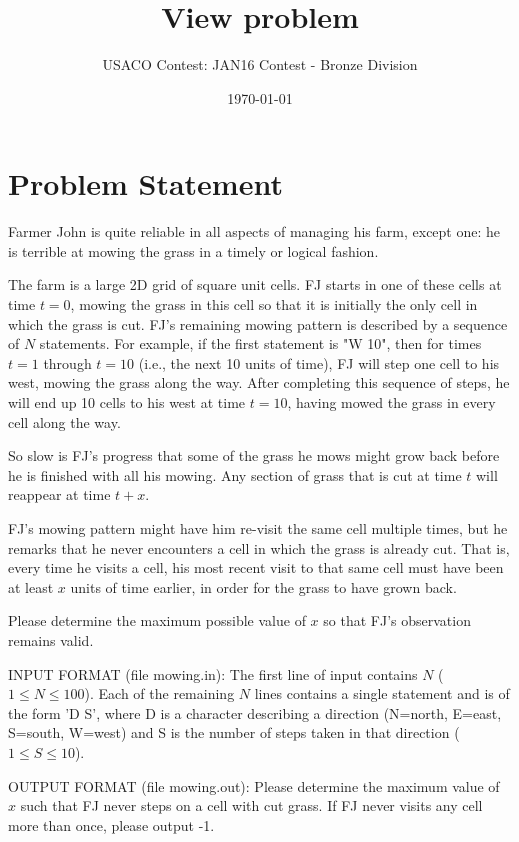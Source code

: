 \documentclass[12pt]{article}
\title{View problem}
\author{USACO Contest: JAN16 Contest - Bronze Division}
\date{\today}
\begin{document}
\maketitle

\section*{Problem Statement}

Farmer John is quite reliable in all aspects of managing his farm, except one:
he is terrible at mowing the grass in a timely or logical fashion.

The farm is a large 2D grid of square unit cells.  FJ starts in one of these
cells at time $t = 0$, mowing the grass in this cell so that it is initially the
only cell in which the grass is cut.  FJ's remaining mowing pattern is 
described by a sequence of $N$ statements.  For example, if the first  statement
is "W 10", then for times $t = 1$ through $t = 10$ (i.e., the next 10 units of
time), FJ will step one cell to his west, mowing the  grass along the way. 
After completing this sequence of steps, he will end up 10 cells to his west at
time $t = 10$, having mowed the grass in every cell along the way. 

So slow is FJ's progress that some of the grass he mows might grow back before
he is finished with all his mowing. Any section of grass that is cut at time $t$
will reappear at time $t + x$. 

FJ's mowing pattern might have him re-visit the same cell multiple times, but he
remarks that he never encounters a cell in which the grass is already cut.  That
is, every time he visits a cell, his most recent visit to that same cell must
have been at least $x$ units of time earlier, in order for the grass to have
grown back.

Please determine the maximum possible value of $x$ so that FJ's observation
remains valid.

INPUT FORMAT (file mowing.in):
The first line of input contains $N$ ($1 \leq N \leq 100$). Each of the
remaining $N$ lines contains a single statement and is of the form 'D S', where
D is a character describing a direction (N=north, E=east, S=south, W=west) and S
is the number of steps taken in that direction ($1 \leq S \leq 10$).  

OUTPUT FORMAT (file mowing.out):
Please determine the maximum value of $x$ such that FJ never steps on a cell
with cut grass.  If FJ never visits any cell more than once, please
output -1.
\end{document}

